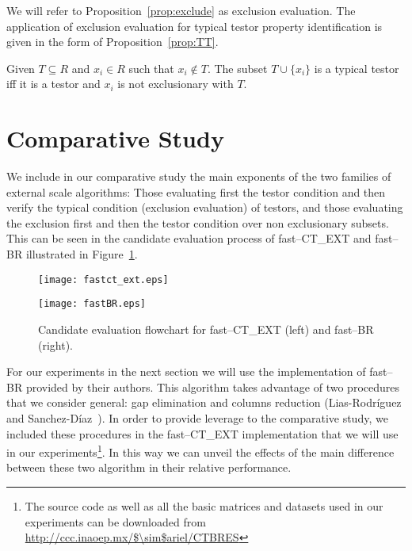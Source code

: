 \documentclass[citeauthoryear]{llncs}
\begin{document}
	We will refer to Proposition~\ref{prop:exclude} as exclusion evaluation. The application of exclusion evaluation for typical testor property identification is given in the form of Proposition~\ref{prop:TT}.
	
	\begin{proposition}\label{prop:TT} 
			Given $T \subseteq R$ and $x_i \in R$ such that $x_i \notin T$. The subset $T \cup \lbrace x_i\rbrace$ is a typical testor iff it is a testor and $x_i$ is not exclusionary with $T$.
	\end{proposition}
		
%
\section{Comparative Study}
%
	We include in our comparative study the main exponents of the two families of external scale algorithms: Those evaluating first the testor condition and then verify the typical condition (exclusion evaluation) of testors, and those evaluating the exclusion first and then the testor condition over non exclusionary subsets. This can be seen in the candidate evaluation process of fast--CT\_EXT and fast--BR illustrated in Figure~\ref{fig:candeval}.
	
	\begin{figure}[htb]
		\label{fig:candeval}
	    \centering
	    \begin{minipage}{.5\textwidth}
	        \centering
	        \texttt{[image: fastct\_ext.eps]}
	    \end{minipage}%
	    \begin{minipage}{0.5\textwidth}
	        \centering
	        \texttt{[image: fastBR.eps]}	        
	    \end{minipage}
		\caption{Candidate evaluation flowchart for fast--CT\_EXT (left) and fast--BR (right).}
	\end{figure}
		
	For our experiments in the next section we will use the implementation of fast--BR provided by their authors. This algorithm takes advantage of two procedures that we consider general: gap elimination and columns reduction (Lias-Rodr\'iguez and Sanchez-D\'iaz~\cite{Lias2013}). In order to provide leverage to the comparative study, we included these procedures in the fast--CT\_EXT implementation that we will use in our experiments\footnote{The source code as well as all the basic matrices and datasets used in our experiments can be downloaded from \url{http://ccc.inaoep.mx/$\sim$ariel/CTBRES}}. In this way we can unveil the effects of the main difference between these two algorithm in their relative performance.
	
\end{document}
